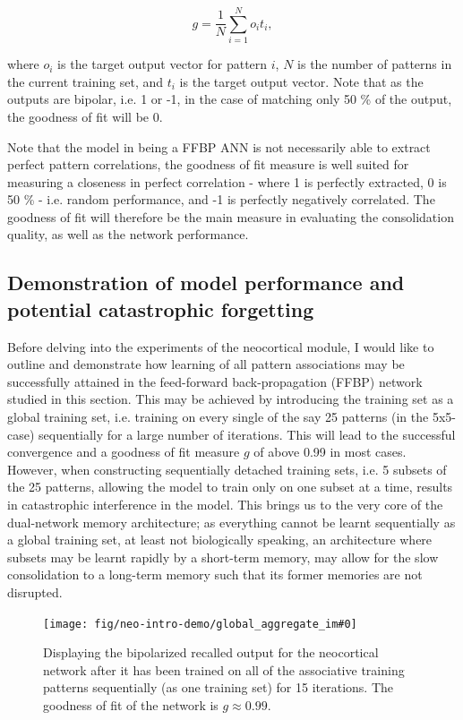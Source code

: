 \begin{equation}
    g = \frac{1}{N} \sum_{i=1}^{N}o_it_i,
\end{equation}

where $o_i$ is the target output vector for pattern $i$, $N$ is the number of patterns in the current training set, and $t_i$ is the target output vector. Note that as the outputs are bipolar, i.e. 1 or -1, in the case of matching only 50 \% of the output, the goodness of fit will be 0.

Note that the model in being a FFBP ANN is not necessarily able to extract perfect pattern correlations, the goodness of fit measure is well suited for measuring a closeness in perfect correlation - where 1 is perfectly extracted, 0 is 50 \% - i.e. random performance, and -1 is perfectly negatively correlated.
The goodness of fit will therefore be the main measure in evaluating the consolidation quality, as well as the network performance.

\subsection{Demonstration of model performance and potential catastrophic forgetting}

Before delving into the experiments of the neocortical module, I would like to outline and demonstrate how learning of all pattern associations may be successfully attained in the feed-forward back-propagation (FFBP) network studied in this section. This may be achieved by introducing the training set as a global training set, i.e. training on every single of the say 25 patterns (in the 5x5-case) sequentially for a large number of iterations. This will lead to the successful convergence and a goodness of fit measure $g$ of above 0.99 in most cases. However, when constructing sequentially detached training sets, i.e. 5 subsets of the 25 patterns, allowing the model to train only on one subset at a time, results in catastrophic interference in the model. This brings us to the very core of the dual-network memory architecture; as everything cannot be learnt sequentially as a global training set, at least not biologically speaking, an architecture where subsets may be learnt rapidly by a short-term memory, may allow for the slow consolidation to a long-term memory such that its former memories are not disrupted.

\begin{figure}
    \centering
    \texttt{[image: fig/neo-intro-demo/global\_aggregate\_im\#0]}
    \caption{Displaying the bipolarized recalled output for the neocortical network after it has been trained on all of the associative training patterns sequentially (as one training set) for 15 iterations. The goodness of fit of the network is $g\approx0.99$.}
    \label{fig:global_aggregate_im}
\end{figure}

